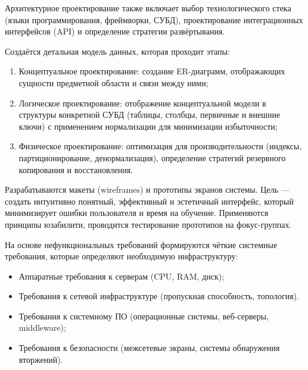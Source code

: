 \documentclass{SibFU-docs}
\begin{document}
\vspace{1em}

Архитектурное проектирование также включает выбор технологического стека (языки программирования, фреймворки, СУБД), проектирование интеграционных интерфейсов (API) и определение стратегии развёртывания.


Создаётся детальная модель данных, которая проходит этапы:

\begin{enumerate}
    \item Концептуальное проектирование: создание ER-диаграмм, отображающих сущности предметной области и связи между ними;
    \item Логическое проектирование: отображение концептуальной модели в структуры конкретной СУБД (таблицы, столбцы, первичные и внешние ключи) с применением нормализации для минимизации избыточности;
    \item Физическое проектирование: оптимизация для производительности (индексы, партиционирование, денормализация), определение стратегий резервного копирования и восстановления.
\end{enumerate}


Разрабатываются макеты (wireframes) и прототипы экранов системы. Цель — создать интуитивно понятный, эффективный и эстетичный интерфейс, который минимизирует ошибки пользователя и время на обучение. Применяются принципы юзабилити, проводится тестирование прототипов на фокус-группах.


На основе нефункциональных требований формируются чёткие системные требования, которые определяют необходимую инфраструктуру:

\begin{itemize}[label=-]
    \item Аппаратные требования к серверам (CPU, RAM, диск);
    \item Требования к сетевой инфраструктуре (пропускная способность, топология).
    \item Требования к системному ПО (операционные системы, веб-серверы, middleware);
    \item Требования к безопасности (межсетевые экраны, системы обнаружения вторжений).
\end{itemize}
\end{document}
